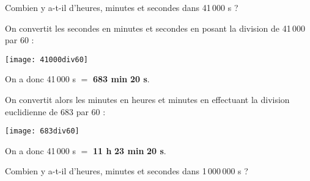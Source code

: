 

\begin{methode*1}

\begin{exemple*1}
Combien y a-t-il d'heures, minutes et secondes dans 41\,000 s ? \\[1em]
\begin{minipage}[t]{.46\textwidth}
On convertit les secondes en minutes et secondes en posant la division de 41\,000 par 60 :

\begin{center}\texttt{[image: 41000div60]} \end{center}

On a donc 41\,000 s $=$ \textcolor{rose}{\textbf{683 min}} \textcolor{vert}{\textbf{20 s}}.
\end{minipage}\hfill%
\begin{minipage}[t]{.46\textwidth}
On convertit alors les minutes en heures et minutes en effectuant la division euclidienne de 683 par 60 :

\begin{center}\texttt{[image: 683div60]} \end{center}
On a donc 41\,000 s $=$ \textcolor{bleu}{\textbf{11 h}} \textcolor{rose}{\textbf{23 min}} \textcolor{vert}{\textbf{20 s}}.
\end{minipage}


\end{exemple*1}

\exercice

Combien y a-t-il d'heures, minutes et secondes dans 1\,000\,000 s ?

\end{methode*1}


